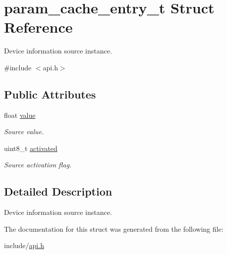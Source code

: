 \hypertarget{structparam__cache__entry__t}{}\section{param\+\_\+cache\+\_\+entry\+\_\+t Struct Reference}
\label{structparam__cache__entry__t}


Device information source instance.  




{\ttfamily \#include $<$api.\+h$>$}

\subsection*{Public Attributes}
\begin{DoxyCompactItemize}
\item 
\mbox{\label{structparam__cache__entry__t_a07493a3131cea5d56a7fdd51b8efa2de}} 
float \hyperlink{structparam__cache__entry__t_a07493a3131cea5d56a7fdd51b8efa2de}{value}
\begin{DoxyCompactList}\small\item\em Source value. \end{DoxyCompactList}\item 
\mbox{\label{structparam__cache__entry__t_a75893ccef997fed39ab1167209b34040}} 
uint8\+\_\+t \hyperlink{structparam__cache__entry__t_a75893ccef997fed39ab1167209b34040}{activated}
\begin{DoxyCompactList}\small\item\em Source activation flag. \end{DoxyCompactList}\end{DoxyCompactItemize}


\subsection{Detailed Description}
Device information source instance. 

The documentation for this struct was generated from the following file\+:\begin{DoxyCompactItemize}
\item 
include/\hyperlink{api_8h}{api.\+h}\end{DoxyCompactItemize}
